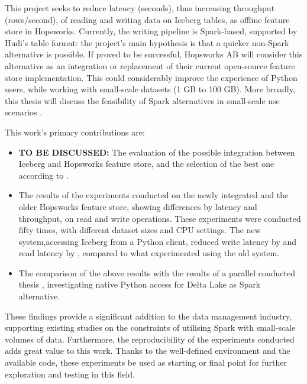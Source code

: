 This project seeks to reduce latency (seconds), thus increasing throughput (rows/second), of reading and writing data on Iceberg tables, as offline feature store in Hopsworks. Currently, the writing pipeline is Spark-based, supported by Hudi's table format: the project's main hypothesis is that a quicker non-Spark alternative is possible. If proved to be successful, Hopsworks \gls{AB} will consider this alternative as an integration or replacement of their current open-source feature store implementation. This could considerably improve the experience of Python users, while working with small-scale datasets (1 GB to 100 GB). More broadly, this thesis will discuss the feasibility of Spark alternatives in small-scale use scenarios \cite{manfrediReducingReadWrite2024}.


This work's primary contributions are:
\begin{itemize}
    \item \textbf{TO BE DISCUSSED:} The evaluation of the possible integration between Iceberg and Hopsworks feature store, and the selection of the best one according to . 
    \item The results of the experiments conducted on the newly integrated and the older Hopsworks feature store, showing differences by latency and throughput, on read and write operations. These experiments were conducted fifty times, with different dataset sizes and \gls{CPU} settings. The new system,accessing Iceberg from a Python client, reduced write latency by  and read latency by , compared to what experimented using the old system.
    \item The comparison of the above results with the results of a parallel conducted thesis \cite{manfrediReducingReadWrite2024}, investigating native Python access for Delta Lake as Spark alternative.
\end{itemize}

These findings provide a significant addition to the data management industry, supporting existing studies on the constraints of utilising Spark with small-scale volumes of data. Furthermore, the reproducibility of the experiments conducted adds great value to this work. Thanks to the well-defined environment and the available code, these experiments be used as starting or final point for further exploration and testing in this field.